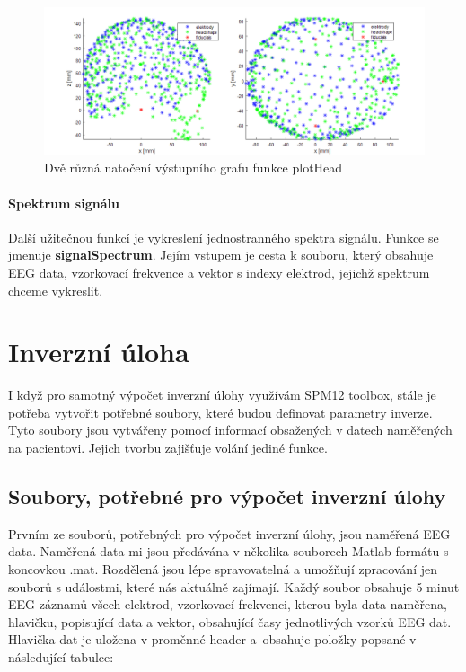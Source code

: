 \begin{figure}[!h]
\includegraphics[width=1.0\textwidth]{casti/implementace/head/hlava.png}
\caption{Dvě různá natočení výstupního grafu funkce plotHead}
\end{figure}


\paragraph{Spektrum signálu}
Další užitečnou funkcí je vykreslení jednostranného spektra signálu. Funkce se jmenuje \textbf{signalSpectrum}. Jejím vstupem je cesta k souboru, který obsahuje EEG data, vzorkovací frekvence a vektor s indexy elektrod, jejichž spektrum chceme vykreslit.


\section{Inverzní úloha}
I když pro samotný výpočet inverzní úlohy využívám SPM12 toolbox, stále je potřeba vytvořit potřebné soubory, které budou definovat parametry inverze. Tyto soubory jsou vytvářeny pomocí informací obsažených v datech naměřených na pacientovi. Jejich tvorbu zajišťuje volání jediné funkce.

\subsection{Soubory, potřebné pro výpočet inverzní úlohy}
Prvním ze souborů, potřebných pro výpočet inverzní úlohy, jsou naměřená EEG data. Naměřená data mi jsou předávána v několika souborech Matlab formátu s koncovkou .mat. Rozdělená jsou lépe spravovatelná a umožňují zpracování jen souborů s událostmi, které nás aktuálně zajímají. Každý soubor obsahuje 5 minut EEG záznamů všech elektrod, vzorkovací frekvenci, kterou byla data naměřena, hlavičku, popisující data a vektor, obsahující časy jednotlivých vzorků EEG dat. Hlavička dat je uložena v proměnné header a~obsahuje položky popsané v následující tabulce:

